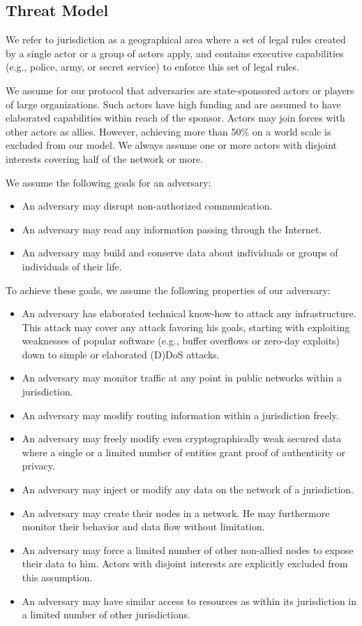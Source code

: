 \documentclass[acmsmall, screen]{acmart}
\begin{document}
\subsection{Threat Model}
We refer to jurisdiction as a geographical area where a set of legal rules created by a single actor or a group of actors apply, and contains executive capabilities (e.g., police, army, or secret service) to enforce this set of legal rules.

We assume for our protocol that adversaries are state-sponsored actors or players of large organizations. Such actors have high funding and are assumed to have elaborated capabilities within reach of the sponsor. Actors may join forces with other actors as allies. However, achieving more than 50\% on a world scale is excluded from our model. We always assume one or more actors with disjoint interests covering half of the network or more. 

We assume the following goals for an adversary:
\begin{itemize}
	\item An adversary may disrupt non-authorized communication.
	\item An adversary may read any information passing through the Internet.
	\item An adversary may build and conserve data about individuals or groups of individuals of their life. 
\end{itemize}

To achieve these goals, we assume the following properties of our adversary:
\begin{itemize}
    \item An adversary has elaborated technical know-how to attack any infrastructure. This attack may cover any attack favoring his goals, starting with exploiting weaknesses of popular software (e.g., buffer overflows or zero-day exploits) down to simple or elaborated (D)DoS attacks.
	\item An adversary may monitor traffic at any point in public networks within a jurisdiction.
	\item An adversary may modify routing information within a jurisdiction freely.
	\item An adversary may freely modify even cryptographically weak secured data where a single or a limited number of entities grant proof of authenticity or privacy.
	\item An adversary may inject or modify any data on the network of a jurisdiction.
	\item An adversary may create their nodes in a network. He may furthermore monitor their behavior and data flow without limitation.
	\item An adversary may force a limited number of other non-allied nodes to expose their data to him. Actors with disjoint interests are explicitly excluded from this assumption.
	\item An adversary may have similar access to resources as within its jurisdiction in a limited number of other jurisdictions.
\end{itemize}
\end{document}
